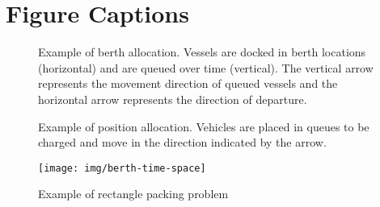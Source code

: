 %

\section*{Figure Captions}

\begin{subfigures}
    \begin{figure}[htpb]
    \centering
        
        \caption{Example of berth allocation. Vessels are docked in berth locations (horizontal) and are queued over
          time (vertical). The vertical arrow represents the movement direction of queued vessels and the horizontal
          arrow represents the direction of departure.}
        \label{subfig:bapexample}
    \end{figure}
    \hfill

    \begin{figure}[htpb]
    \centering
        
        \caption{Example of position allocation. Vehicles are placed in queues to be charged and move in the direction
          indicated by the arrow.}
        \label{subfig:papexample}
    \end{figure}
\end{subfigures}




\begin{figure}[htpb]
\centering
    \texttt{[image: img/berth-time-space]}
    \caption{Example of rectangle packing problem}
    \label{fig:packexample}
\end{figure}

